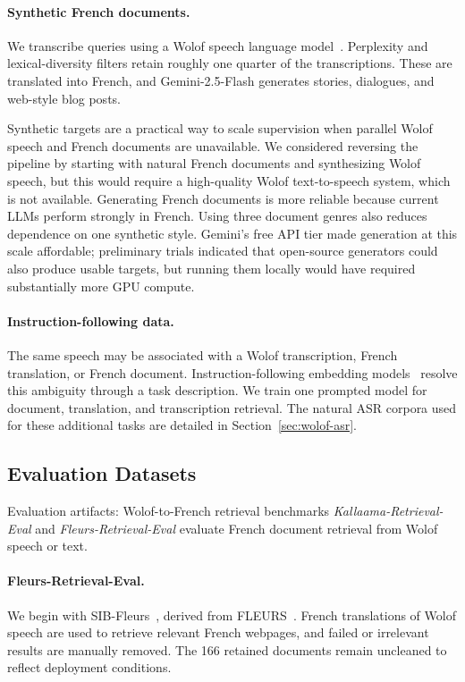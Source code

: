 \paragraph{Synthetic French documents.}
We transcribe queries using a Wolof speech language model~\citep{sy2025speechlanguagemodelsunderrepresented}. Perplexity and lexical-diversity filters retain roughly one quarter of the transcriptions. These are translated into French, and Gemini-2.5-Flash generates stories, dialogues, and web-style blog posts.

Synthetic targets are a practical way to scale supervision when parallel Wolof speech and French documents are unavailable. We considered reversing the pipeline by starting with natural French documents and synthesizing Wolof speech, but this would require a high-quality Wolof text-to-speech system, which is not available. Generating French documents is more reliable because current LLMs perform strongly in French. Using three document genres also reduces dependence on one synthetic style. Gemini's free API tier made generation at this scale affordable; preliminary trials indicated that open-source generators could also produce usable targets, but running them locally would have required substantially more GPU compute.

\paragraph{Instruction-following data.}
The same speech may be associated with a Wolof transcription, French translation, or French document. Instruction-following embedding models~\citep{peng-etal-2024-answer} resolve this ambiguity through a task description. We train one prompted model for document, translation, and transcription retrieval. The natural ASR corpora used for these additional tasks are detailed in Section~\ref{sec:wolof-asr}.

\subsection{Evaluation Datasets}

\begin{insightbox}{Evaluation artifacts: Wolof-to-French retrieval benchmarks}
\emph{Kallaama-Retrieval-Eval} and \emph{Fleurs-Retrieval-Eval} evaluate French document retrieval from Wolof speech or text.
\end{insightbox}

\paragraph{Fleurs-Retrieval-Eval.}
We begin with SIB-Fleurs~\citep{schmidt2025fleursslumassivelymultilingualbenchmark}, derived from FLEURS~\citep{fleurs}. French translations of Wolof speech are used to retrieve relevant French webpages, and failed or irrelevant results are manually removed. The 166 retained documents remain uncleaned to reflect deployment conditions.

